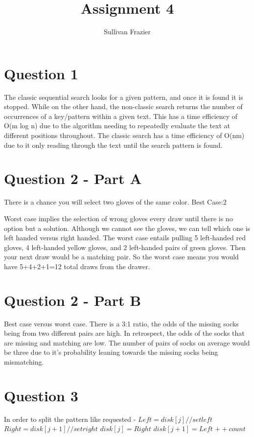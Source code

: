 \documentclass[11pt]{article} %
\title{Assignment 4}
\author{Sullivan Frazier}
\begin{document}
\maketitle


\section {Question 1}
	
	The classic sequential search looks for a given pattern, and once it is found it is stopped. While on the other hand, the non-classic search returns the number of occurrences of a key/pattern within a given text. This has a time efficiency of O(m log n) due to the algorithm needing to repeatedly evaluate the text at different positions throughout. The classic search has a time efficiency of O(nm) due to it only reading through the text until the search pattern is found. 

\section {Question 2 - Part A}
	
	There is a chance you will select two gloves of the same color. Best Case:2
	
	Worst case implies the selection of wrong gloves every draw until there is no option but a solution. Although we cannot see the gloves, we can tell which one is left handed versus right handed. The worst case entails pulling 5 left-handed red gloves, 4 left-handed yellow gloves, and 2 left-handed pairs of green gloves. Then your next draw would be a matching pair. So the worst case means you would have  5+4+2+1=12 total draws from the drawer.

\section {Question 2 - Part B}
		Best case versus worst case. There is a 3:1 ratio, the odds of the missing socks being from two different pairs are high. In retrospect, the odds of the socks that are missing and matching are low. The number of pairs of socks on average would be three due to it's probability leaning towards the missing socks being mismatching.
		
\section {Question 3}
\begin{algorithmic}
	\State In order to split the pattern like requested - 
	\State $Left = disk[j]//set left$
	\State $Right = disk[j+1]//set right$
		\State $disk[j] = Right$
		\State $disk[j+1] = Left$
		\State $++count$
	\EndIf
\EndFor
\EndFor
\end{algorithmic}
\end{document}
